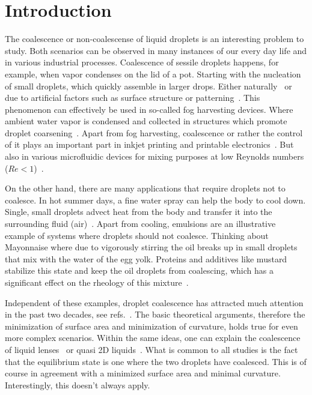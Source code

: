 \documentclass[twocolumn,amsmath,amssymb,showpacs,pre,nofootinbib,superscriptaddress]{revtex4-1} %
\begin{document}
\maketitle

\newcommand{\ts}{\textsuperscript}

\section{Introduction}\label{sec:intro}
The coalescence or non-coalescense of liquid droplets is an interesting problem to study. 
Both scenarios can be observed in many instances of our every day life and in various industrial processes.
Coalescence of sessile droplets happens, for example, when vapor condenses on the lid of a pot.
Starting with the nucleation of small droplets, which quickly assemble in larger drops. 
Either naturally~\cite{PhysRevA.43.1906} or due to artificial factors such as surface structure or patterning~\cite{C1SM06219K}. 
This phenomenon can effectively be used in so-called fog harvesting devices. 
Where ambient water vapor is condensed and collected in structures which promote droplet coarsening~\cite{zhang2015inkjet, shi2018fog}.
Apart from fog harvesting, coalescence or rather the control of it plays an important part in inkjet printing and printable electronics~\cite{jo2009evaluation, singh2010inkjet, Kim_2005, Luechinger_2008}.
But also in various microfluidic devices for mixing purposes at low Reynolds numbers ($Re < 1$)~\cite{https://doi.org/10.1002/pen.760352206, doi:10.1063/1.858199}. 

On the other hand, there are many applications that require droplets not to coalesce.
In hot summer days, a fine water spray can help the body to cool down.
Single, small droplets advect heat from the body and transfer it into the surrounding fluid (air)~\cite{kim2007spray}.
Apart from cooling, emulsions are an illustrative example of systems where droplets should not coalesce.
Thinking about Mayonnaise where due to vigorously stirring the oil breaks up in small droplets that mix with the water of the egg yolk.
Proteins and additives like mustard stabilize this state and keep the oil droplets from coalescing, which has a significant effect on the rheology of this mixture~\cite{harrison1985factors, DEPREE2001157}.

Independent of these examples, droplet coalescence has attracted much attention in the past two decades, see refs.~\cite{eggers_lister_stone_1999, duchemin_eggers_josserand_2003, PhysRevLett.95.164503, PhysRevLett.106.114501, doi:10.1063/1.4828721}. 
The basic theoretical arguments, therefore the minimization of surface area and minimization of curvature, holds true for even more complex scenarios. 
Within the same ideas, one can explain the coalescence of liquid lenses~\cite{PhysRevLett.124.194502} or quasi 2D liquids~\cite{klopp2020self, doi:10.1021/acs.langmuir.0c02139}.
What is common to all studies is the fact that the equilibrium state is one where the two droplets have coalesced.
This is of course in agreement with a minimized surface area and minimal curvature.
Interestingly, this doesn't always apply.
\end{document}
